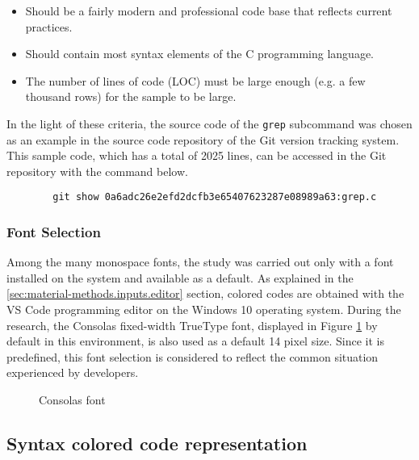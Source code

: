 \documentclass{article}
\begin{document}
\begin{itemize}
  \item Should be a fairly modern and professional code base that reflects current practices.

  \item Should contain most syntax elements of the C programming language.

  \item The number of lines of code (LOC) must be large enough (e.g. a few thousand rows) for the sample to be large.
\end{itemize}

In the light of these criteria, the source code\cite{github2022gitgrep} of the \texttt{grep} subcommand\cite{git2022grep} was chosen as an example in the source code repository\cite{github2022gitrepo} of the Git\cite{git2022homepage} version tracking system. This sample code, which has a total of 2025 lines, can be accessed in the Git repository with the command below.

\begin{verbatim}
        git show 0a6adc26e2efd2dcfb3e65407623287e08989a63:grep.c
\end{verbatim}

\subsubsection{Font Selection} \label{sec:material-methods.inputs.font}
	
Among the many monospace fonts, the study was carried out only with a font installed on the system and available as a
default. As explained in the \ref{sec:material-methods.inputs.editor} section, colored codes are obtained with the VS
Code programming editor on the Windows 10 operating system. During the research, the
Consolas\cite{microsoft2022consolas} fixed-width TrueType font, displayed in Figure \ref{fig:consolas} by default in
this environment, is also used as a default 14 pixel size. Since it is predefined, this font selection is considered to
reflect the common situation experienced by developers.

\begin{figure}[h]
  \centering
  
  \caption{Consolas font}
  \label{fig:consolas}
\end{figure}

\subsection{Syntax colored code representation}
\end{document}

